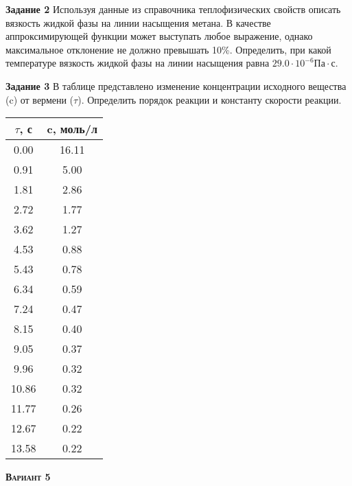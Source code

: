 \textbf{Задание 2}  Используя данные из справочника теплофизических свойств описать вязкость жидкой фазы на линии насыщения метана. В качестве аппроксимирующей функции может выступать любое выражение, однако максимальное отклонение не должно превышать 10\%. Определить, при какой температуре вязкость жидкой фазы на линии насыщения равна $    29.0 \cdot 10^{-6} \text{Па} \cdot \text{с}$.

\textbf{Задание 3} В таблице представлено изменение концентрации исходного вещества (c) от вермени ($\tau$). Определить порядок реакции и константу скорости реакции.

\begin{table}[h]
\begin{tabular}{|c|c|}
\hline
$\tau$, с & c, моль/л \\ \hline
 0.00 &      16.11 \\ \hline 
 0.91 &       5.00 \\ \hline 
 1.81 &       2.86 \\ \hline 
 2.72 &       1.77 \\ \hline 
 3.62 &       1.27 \\ \hline 
 4.53 &       0.88 \\ \hline 
 5.43 &       0.78 \\ \hline 
 6.34 &       0.59 \\ \hline 
 7.24 &       0.47 \\ \hline 
 8.15 &       0.40 \\ \hline 
 9.05 &       0.37 \\ \hline 
 9.96 &       0.32 \\ \hline 
10.86 &       0.32 \\ \hline 
11.77 &       0.26 \\ \hline 
12.67 &       0.22 \\ \hline 
13.58 &       0.22 \\ \hline 
\end{tabular}
\end{table}

\newpage

\textsc{\textbf{Вариант 5}}

